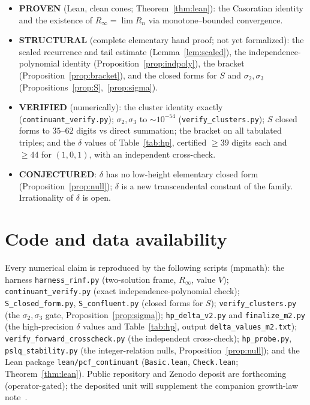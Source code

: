 \documentclass[11pt]{article}
\newcommand{\Rinf}{R_\infty}
\begin{document}
\begin{itemize}
\item \textbf{PROVEN} (Lean, clean cones; Theorem~\ref{thm:lean}): the Casoratian
identity and the existence of $\Rinf=\lim R_n$ via monotone--bounded convergence.
\item \textbf{STRUCTURAL} (complete elementary hand proof; not yet formalized): the
scaled recurrence and tail estimate (Lemma~\ref{lem:scaled}), the
independence-polynomial identity (Proposition~\ref{prop:indpoly}), the bracket
(Proposition~\ref{prop:bracket}), and the closed forms for $S$ and
$\sigma_2,\sigma_3$ (Propositions~\ref{prop:S},~\ref{prop:sigma}).
\item \textbf{VERIFIED} (numerically): the cluster identity exactly
(\texttt{continuant\_verify.py}); $\sigma_2,\sigma_3$ to $\sim10^{-54}$
(\texttt{verify\_clusters.py}); $S$ closed forms to $35$--$62$ digits vs direct
summation; the bracket on all tabulated triples; and the $\delta$ values of
Table~\ref{tab:hp}, certified $\ge39$ digits each and $\ge44$ for $(1,0,1)$, with an
independent cross-check.
\item \textbf{CONJECTURED}: $\delta$ has no low-height elementary closed form
(Proposition~\ref{prop:null}); $\delta$ is a new transcendental constant of the
family. Irrationality of $\delta$ is open.
\end{itemize}

\section{Code and data availability}\label{sec:code}

Every numerical claim is reproduced by the following scripts (mpmath): the harness
\texttt{harness\_rinf.py} (two-solution frame, $\Rinf$, value $V$);
\texttt{continuant\_verify.py} (exact independence-polynomial check);
\texttt{S\_closed\_form.py}, \texttt{S\_confluent.py} (closed forms for $S$);
\texttt{verify\_clusters.py} (the $\sigma_2,\sigma_3$ gate, Proposition~\ref{prop:sigma});
\texttt{hp\_delta\_v2.py} and \texttt{finalize\_m2.py} (the high-precision $\delta$
values and Table~\ref{tab:hp}, output \texttt{delta\_values\_m2.txt});
\texttt{verify\_forward\_crosscheck.py} (the independent cross-check);
\texttt{hp\_probe.py}, \texttt{pslq\_stability.py} (the integer-relation nulls,
Proposition~\ref{prop:null}); and the Lean package \texttt{lean/pcf\_continuant}
(\texttt{Basic.lean}, \texttt{Check.lean}; Theorem~\ref{thm:lean}). Public
repository and Zenodo deposit are forthcoming (operator-gated); the deposited unit
will supplement the companion growth-law note~\cite{growth}.
\end{document}
